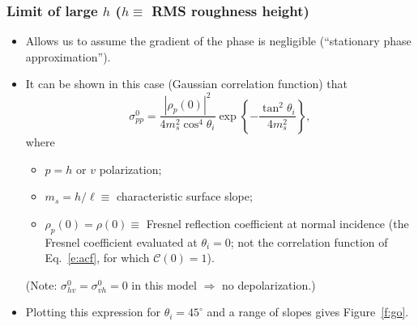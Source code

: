 \documentclass[11pt, oneside]{article}
\begin{document}
\subsubsection{Limit of large $h$ ($h \equiv$ RMS roughness height)}

\begin{itemize}
	\item Allows us to assume the gradient of the phase is negligible (``stationary phase approximation'').
	\item It can be shown in this case (Gaussian correlation function) that
	\begin{equation}
		\label{e:go}
		\sigma_{pp}^0 = \frac{|\rho_p(0)|^2}{4m_s^2\cos^4\theta_i}\exp\left\{-\frac{\tan^2\theta_i}{4m_s^2}\right\},
	\end{equation}
	where
	\begin{itemize}
		\item $p = h$ or $v$ polarization;
		\item $m_s = h/\ell \equiv$ characteristic surface slope;
		\item $\rho_p(0) = \rho(0) \equiv$ Fresnel reflection coefficient at normal incidence (the Fresnel coefficient evaluated at $\theta_i = 0$; not the correlation function of Eq.~\eqref{e:acf}, for which $\mathcal{C}(0) = 1$).
	\end{itemize}
	(Note: $\sigma_{hv}^0 = \sigma_{vh}^0 = 0$ in this model $\Rightarrow$ no depolarization.)
	\item Plotting this expression for $\theta_i = 45^\circ$ and a range of slopes gives Figure~\ref{f:go}.
\end{itemize}
\end{document}
